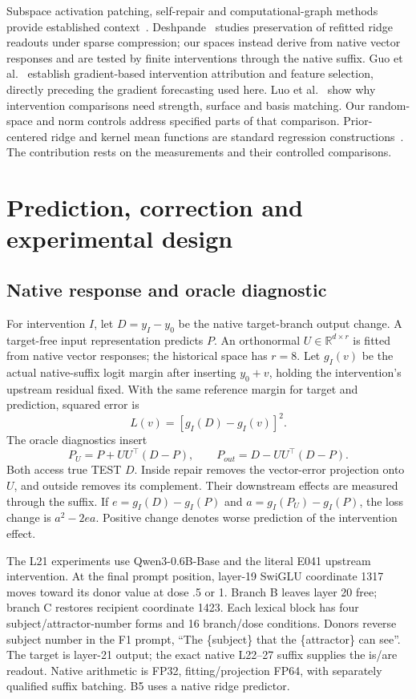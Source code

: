 \documentclass[11pt]{article}
\begin{document}
Subspace activation patching, self-repair and computational-graph methods provide established context~\cite{makelov2023,rushing2024,ameisen2025,farnik2025}. Deshpande~\cite{deshpande2026} studies preservation of refitted ridge readouts under sparse compression; our spaces instead derive from native vector responses and are tested by finite interventions through the native suffix. Guo et al.~\cite{guo2026} establish gradient-based intervention attribution and feature selection, directly preceding the gradient forecasting used here. Luo et al.~\cite{luo2026} show why intervention comparisons need strength, surface and basis matching. Our random-space and norm controls address specified parts of that comparison. Prior-centered ridge and kernel mean functions are standard regression constructions~\cite{rasmussen2006}. The contribution rests on the measurements and their controlled comparisons.

\section{Prediction, correction and experimental design}
\subsection{Native response and oracle diagnostic}
For intervention $I$, let $D=y_I-y_0$ be the native target-branch output change. A target-free input representation predicts $P$. An orthonormal $U\in\mathbb R^{d\times r}$ is fitted from native vector responses; the historical space has $r=8$. Let $g_I(v)$ be the actual native-suffix logit margin after inserting $y_0+v$, holding the intervention's upstream residual fixed. With the same reference margin for target and prediction, squared error is
\[
 L(v)=[g_I(D)-g_I(v)]^2.
\]
The oracle diagnostics insert
\[
 P_U=P+UU^\top(D-P),\qquad P_{out}=D-UU^\top(D-P).
\]
Both access true TEST $D$. Inside repair removes the vector-error projection onto $U$, and outside removes its complement. Their downstream effects are measured through the suffix. If $e=g_I(D)-g_I(P)$ and $a=g_I(P_U)-g_I(P)$, the loss change is $a^2-2ea$. Positive change denotes worse prediction of the intervention effect.

The L21 experiments use Qwen3-0.6B-Base and the literal E041 upstream intervention. At the final prompt position, layer-19 SwiGLU coordinate 1317 moves toward its donor value at dose .5 or 1. Branch B leaves layer 20 free; branch C restores recipient coordinate 1423. Each lexical block has four subject/attractor-number forms and 16 branch/dose conditions. Donors reverse subject number in the F1 prompt, ``The \{subject\} that the \{attractor\} can see''. The target is layer-21 output; the exact native L22--27 suffix supplies the is/are readout. Native arithmetic is FP32, fitting/projection FP64, with separately qualified suffix batching. B5 uses a native ridge predictor.
\end{document}
